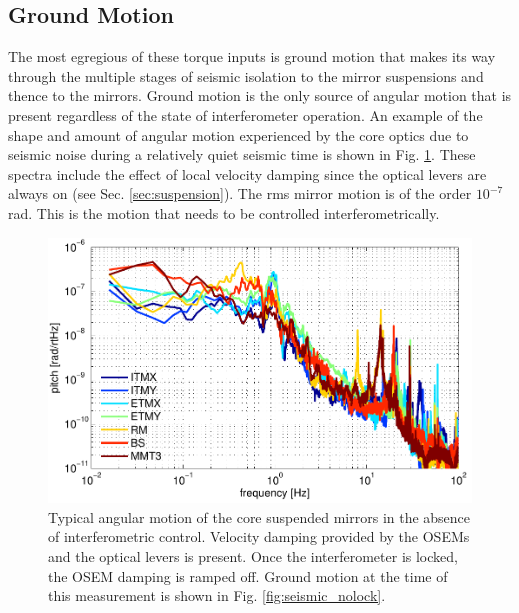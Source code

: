 \subsection{Ground Motion} 
The most egregious of these torque inputs is ground motion that makes its way through the multiple stages of seismic isolation to the mirror suspensions and thence to the mirrors. Ground motion is the only source of angular motion that is present regardless of the state of interferometer operation. An example of the shape and amount of angular motion experienced by the core optics due to seismic noise during a relatively quiet seismic time is shown in Fig. \ref{fig:seismicMirror}. These spectra include the effect of local velocity damping since the optical levers are always on (see Sec. \ref{sec:suspension}). The rms mirror motion is of the order $10^{-7}$ rad. This is the motion that needs to be controlled interferometrically.

\begin{figure}
\begin{centering}
\includegraphics[width=1.0\columnwidth]{figures/seismic_mirrormotion.pdf}
\caption[Typical angular motion of the core suspended mirrors in the
  absence of interferometric control]{Typical angular motion of the core suspended mirrors in the
  absence of interferometric control. Velocity damping provided by the
  OSEMs and the optical levers is present. Once the interferometer is locked, the OSEM damping is ramped off. Ground motion at the time of this measurement is shown in Fig. \ref{fig:seismic_nolock}.}
\label{fig:seismicMirror}
\end{centering}
\end{figure}


